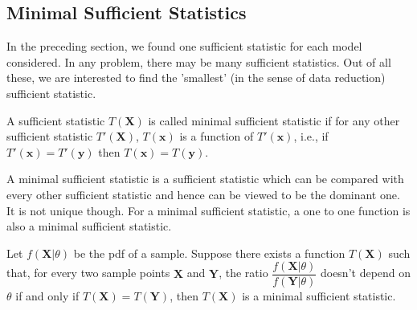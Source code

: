 \documentclass[a4paper,english,12pt]{article}
\newcommand{\bx}{\mathbf{x}}
\newcommand{\by}{\mathbf{y}}
\newcommand{\bX}{\mathbf{X}}
\newcommand{\bY}{\mathbf{Y}}
\begin{document}
\subsection{Minimal Sufficient Statistics}
In the preceding section, we found one sufficient statistic for each model considered. In any problem, there may be many sufficient statistics. Out of all these, we are interested to find the 'smallest' (in the sense of data reduction) sufficient statistic.
\begin{defn}
A sufficient statistic $T(\bX)$ is called minimal sufficient statistic if for any other sufficient statistic $T'(\bX)$, $T(\bx)$ is a function of $T'(\bx)$, i.e., if $T'(\bx)=T'(\by)$ then $T(\bx)=T(\by)$.
 \end{defn}
A minimal sufficient statistic is a sufficient statistic which can be compared with every other sufficient statistic and hence can be viewed to be the dominant one. It is not unique though. For a minimal sufficient statistic, a one to one function is also a minimal sufficient statistic. 
\begin{thm} \label {thm:find_mss}
Let $f(\bX|\theta)$ be the pdf of a sample. Suppose there exists a function $T(\bX)$ such that, for every two sample points $\bX$ and $\bY$, the ratio $\dfrac{f(\bX|\theta)}{f(\bY|\theta)}$ doesn't depend on $\theta$ if and only if $T(\bX) = T(\bY)$, then $T(\bX)$ is a minimal sufficient statistic.
\end{thm}
\end{document}
